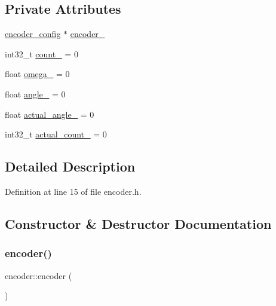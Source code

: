 \subsection*{Private Attributes}
\begin{DoxyCompactItemize}
\item 
\mbox{\hyperlink{structencoder__config}{encoder\+\_\+config}} $\ast$ \mbox{\hyperlink{classencoder_aa59894d07cce9165245828c4e00c92e9}{encoder\+\_\+}}
\item 
int32\+\_\+t \mbox{\hyperlink{classencoder_aedc86e67789159d0dfa7bb5f1d567828}{count\+\_\+}} = 0
\item 
float \mbox{\hyperlink{classencoder_ab5cf8c446a23b0676547586f838e754d}{omega\+\_\+}} = 0
\item 
float \mbox{\hyperlink{classencoder_a1eaaad413fa84f01afad8db46bd8d4d3}{angle\+\_\+}} = 0
\item 
float \mbox{\hyperlink{classencoder_a0504f918c64ca82564cfb66cb2ca3913}{actual\+\_\+angle\+\_\+}} = 0
\item 
int32\+\_\+t \mbox{\hyperlink{classencoder_aa57c45e46555d4b6ab3abc316485449e}{actual\+\_\+count\+\_\+}} = 0
\end{DoxyCompactItemize}


\subsection{Detailed Description}


Definition at line 15 of file encoder.\+h.



\subsection{Constructor \& Destructor Documentation}
\mbox{\label{classencoder_af19dfa89c07692c0b1da8f24aec3d52d}} 
\subsubsection{\texorpdfstring{encoder()}{encoder()}\hspace{0.1cm}{\footnotesize\ttfamily [1/4]}}
{\footnotesize\ttfamily encoder\+::encoder (\begin{DoxyParamCaption}{ }\end{DoxyParamCaption})\hspace{0.3cm}{\ttfamily [inline]}}



